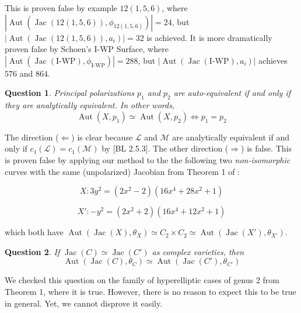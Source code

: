 \documentclass[12pt,reqno]{amsart}
\DeclareMathOperator{\Aut}{Aut}
\DeclareMathOperator{\Jac}{Jac}
\newcommand{\mc}{\mathcal}
\newtheorem*{question}{Question}
\theoremstyle{definition}
\theoremstyle{remark}
\begin{document}
This is proven false by example $12(1,5,6)$, where $|\Aut(\Jac(12(1, 5, 6)), \phi_{12(1, 5, 6)})| = 24$, but $|\Aut(\Jac(12(1, 5, 6)), a_i)| = 32$ is achieved. It is more dramatically proven false by Schoen's I-WP Surface, where $|\Aut(\Jac(\text{I-WP}), \phi_{\text{I-WP}})| = 288$, but $|\Aut(\Jac(\text{I-WP}), a_i)|$ achieves $576$ and $864$.

\begin{question} Principal polarizations $p_1$ and $p_2$ are auto-equivalent if and only if they are analytically equivalent. In other words, $$\Aut(X, p_1) \simeq \Aut(X, p_2) \Leftrightarrow p_1 = p_2$$ \end{question}

The direction ($\Leftarrow$) is clear because $\mc{L}$ and $\mc{M}$ are analytically equivalent if and only if $c_1(\mc{L}) = c_1(\mc{M})$ by [BL 2.5.3]. The other direction ($\Rightarrow$) is false.  This is proven false by applying our method to the the following two \textit{non-isomorphic} curves with the same (unpolarized) Jacobian from Theorem 1 of \cite{howe1}:

$$X: 3y^2 = (2x^2- 2)(16x^4 + 28x^2 + 1)$$ 

$$X': -y^2 = (2x^2 + 2)(16x^4 + 12x^2 + 1)$$ 

which both have $\Aut(\Jac(X), \theta_X)\simeq C_2 \times C_2 \simeq \Aut(\Jac(X'), \theta_{X'})$. 

\begin{question} If $\Jac(C) \simeq \Jac(C')$ as complex varieties, then $$\Aut(\Jac(C), \theta_C) \simeq \Aut(\Jac(C'), \theta_{C'})$$  \end{question} 

We checked this question on the family of hyperelliptic cases of genus 2 from \cite{howe1} Theorem 1, where it is true. However, there is no reason to expect this to be true in general. Yet, we cannot disprove it easily. 
\end{document}
